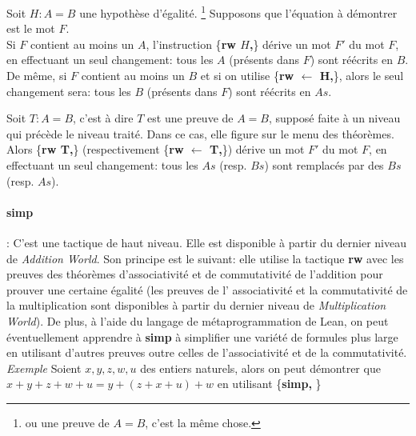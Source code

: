 Soit $H : A = B$ une hypothèse d'égalité. \footnote{ou une preuve de $A = B$, c'est la même chose.}
Supposons que l'équation à démontrer est le mot $F$. \\Si $F$ contient au moins un $A$, l'instruction \big\{\textbf{rw $H$,}\big\} dérive un mot $F'$ du mot $F$, en effectuant un seul changement: tous les $A$ (présents dans $F$) sont réécrits en $B$. De même, si $F$ contient au moins un $B$ et si on utilise \big\{\textbf{rw $\leftarrow$ H,}\big\}, alors le seul changement sera: tous les $B$ (présents dans $F$) sont réécrits en $As$.

Soit $T: A=B$, c'est à dire $T$ est une preuve de $A=B$, supposé faite à un niveau qui précède le niveau traité. Dans ce cas, elle figure sur le menu des théorèmes. Alors \big\{\textbf{rw T,}\big\} (respectivement \big\{\textbf{rw $\leftarrow$ T,}\big\}) dérive un mot $F'$ du mot $F$, en effectuant un seul changement: tous les $As$ (resp. $Bs$) sont remplacés par des $Bs$ (resp. $As$). 

\paragraph {simp}: C'est une tactique de haut niveau. Elle est disponible à partir du dernier niveau de \textit{Addition World}. Son principe est le suivant: elle utilise la tactique \textbf{rw} avec les preuves des théorèmes d'associativité et de commutativité de l'addition pour prouver une certaine égalité (les preuves de l' associativité et la commutativité de la multiplication sont disponibles à partir du dernier niveau de \textit{Multiplication World}). De plus, à l'aide du langage de métaprogrammation de Lean, on peut éventuellement apprendre  à \textbf{simp} à simplifier une variété de formules plus large en utilisant d'autres preuves outre celles de l'associativité et de la commutativité.   \\
\textit{Exemple} Soient $x,y,z,w,u$ des entiers naturels, alors on peut démontrer que $x+y+z+w+u=y+(z+x+u)+w$ en utilisant \big\{\textbf{simp,} \big\}



